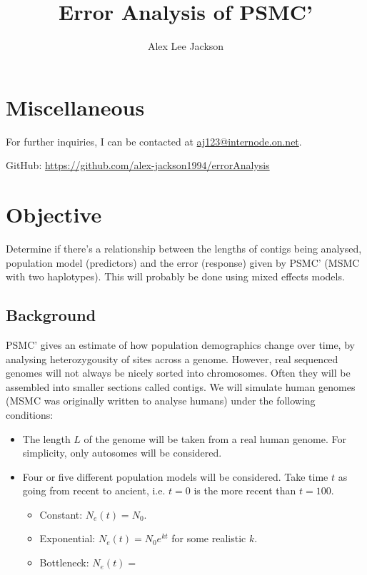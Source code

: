 \documentclass[11pt,a4paper]{article}
\title{Error Analysis of PSMC'}
\author{Alex Lee Jackson}
\begin{document}
\maketitle

%
\section{Miscellaneous}
For further inquiries, I can be contacted at \href{mailto:aj123@internode.on.net}{aj123@internode.on.net}.

GitHub: \url{https://github.com/alex-jackson1994/errorAnalysis}

\section{Objective}
Determine if there's a relationship between the lengths of contigs being analysed, population model (predictors) and the error (response) given by PSMC' (MSMC\cite{schiffels2014inferring} with two haplotypes). This will probably be done using mixed effects models.

\subsection{Background}
PSMC' gives an estimate of how population demographics change over time, by analysing heterozygousity of sites across a genome. However, real sequenced genomes will not always be nicely sorted into chromosomes. Often they will be assembled into smaller sections called contigs. We will simulate human genomes (MSMC was originally written to analyse humans) under the following conditions:
\begin{itemize}
\item The length $L$ of the genome will be taken from a real human genome. For simplicity, only autosomes will be considered.
\item Four or five different population models will be considered. Take time $t$ as going from recent to ancient, i.e. $t=0$ is the more recent than $t=100$.
\begin{itemize}
\item Constant: $N_e(t)=N_0$.
\item Exponential: $N_e(t)=N_0e^{kt}$ for some realistic $k$.
\item Bottleneck: $N_e(t)=$
\end{itemize}
\end{itemize}
\end{document}
